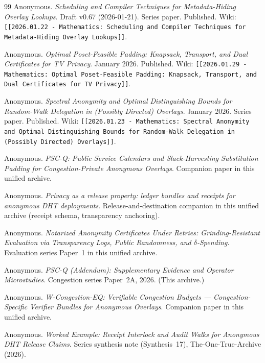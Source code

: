 \documentclass[11pt]{article}
\theoremstyle{definition}
\theoremstyle{remark}
\begin{document}
\begin{thebibliography}{99}
Anonymous.
\newblock \emph{Scheduling and Compiler Techniques for Metadata-Hiding Overlay Lookups}.
\newblock Draft v0.67 (2026-01-21). Series paper.
\newblock Published. Wiki: \texttt{[[2026.01.22 - Mathematics: Scheduling and Compiler Techniques for Metadata-Hiding Overlay Lookups]]}.

Anonymous.
\newblock \emph{Optimal Poset-Feasible Padding: Knapsack, Transport, and Dual Certificates for TV Privacy}.
\newblock January 2026. Published. Wiki: \texttt{[[2026.01.29 - Mathematics: Optimal Poset-Feasible Padding: Knapsack, Transport, and Dual Certificates for TV Privacy]]}.

Anonymous.
\newblock \emph{Spectral Anonymity and Optimal Distinguishing Bounds for Random-Walk Delegation in (Possibly Directed) Overlays}.
\newblock January 2026. Series paper.
\newblock Published. Wiki: \texttt{[[2026.01.23 - Mathematics: Spectral Anonymity and Optimal Distinguishing Bounds for Random-Walk Delegation in (Possibly Directed) Overlays]]}.

Anonymous.
\newblock \emph{PSC-Q: Public Service Calendars and Slack-Harvesting Substitution Padding for Congestion-Private Anonymous Overlays}.
\newblock Companion paper in this unified archive.

Anonymous.
\newblock \emph{Privacy as a release property: ledger bundles and receipts for anonymous DHT deployments}.
\newblock Release-and-destination companion in this unified archive (receipt schema, transparency anchoring).

Anonymous.
\newblock \emph{Notarized Anonymity Certificates Under Retries: Grinding-Resistant Evaluation via Transparency Logs, Public Randomness, and $\delta$-Spending}.
\newblock Evaluation series Paper~1 in this unified archive.

Anonymous.
\newblock \emph{PSC-Q (Addendum): Supplementary Evidence and Operator Microstudies}.
\newblock Congestion series Paper~2A, 2026. (This archive.)

Anonymous.
\newblock \emph{W-Congestion-EQ: Verifiable Congestion Budgets --- Congestion-Specific Verifier Bundles for Anonymous Overlays}.
\newblock Companion paper in this unified archive.

Anonymous.
\newblock \emph{Worked Example: Receipt Interlock and Audit Walks for Anonymous DHT Release Claims}.
\newblock Series synthesis note (Synthesis~17), The-One-True-Archive (2026).


\end{thebibliography}
\end{document}
